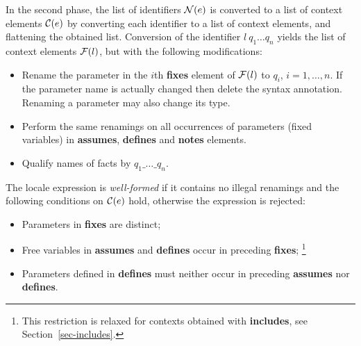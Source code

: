 \begin{isabellebody}
\begin{isamarkuptext}
  In the second phase, the list of identifiers $\mathcal{N}(e)$ is converted to
  a list of context elements $\mathcal{C}(e)$ by converting each identifier to
  a list of context elements, and flattening the obtained list.
  Conversion of the identifier $l\:q_1 \ldots q_n$ yields the list of
  context elements $\mathcal{F}(l)$, but with the following modifications:
\begin{itemize}
\item
  Rename the parameter in the $i$th \textbf{fixes} element of $\mathcal{F}(l)$
  to $q_i$, $i = 1, \ldots, n$.  If the parameter name is actually
  changed then delete the syntax annotation.  Renaming a parameter may
  also change its type.
\item
  Perform the same renamings on all occurrences of parameters (fixed
  variables) in \textbf{assumes}, \textbf{defines} and \textbf{notes}
  elements.
\item
  Qualify names of facts by $q_1\_\ldots\_q_n$.
\end{itemize}
  The locale expression is \emph{well-formed} if it contains no
  illegal renamings and the following conditions on $\mathcal{C}(e)$ hold,
  otherwise the expression is rejected:
\begin{itemize}
\item Parameters in \textbf{fixes} are distinct;
\item Free variables in \textbf{assumes} and
  \textbf{defines} occur in preceding \textbf{fixes};%
\footnote{This restriction is relaxed for contexts obtained with
  \textbf{includes}, see Section~\ref{sec-includes}.}
\item Parameters defined in \textbf{defines} must neither occur in
  preceding \textbf{assumes} nor \textbf{defines}.
\end{itemize}%
\end{isamarkuptext}%
\isamarkuptrue%
%
\isamarkuptrue%
%
\begin{isamarkuptext}%

\end{isamarkuptext}
\end{isabellebody}
